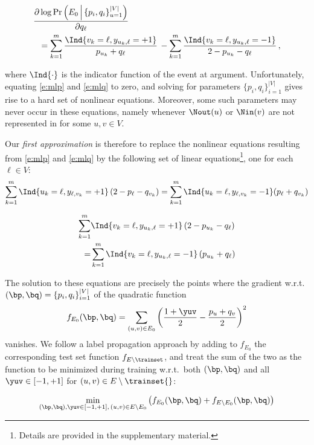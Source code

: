 \begin{align}
&\frac{\partial \log \Pr\left(E_0 \,\Big|\, \{p_i, q_i\}_{u=1}^{|V|}\right)}{\partial q_{\ell}}\label{e:mlq}\\
&\ \ =
\sum_{k=1}^m
\frac{\Ind{v_k = \ell,y_{u_k,\ell}=+1}}{p_{u_k}+q_{\ell}}\,
- \sum_{k=1}^m
\frac{\Ind{v_k = \ell,y_{u_k,\ell}=-1}}{2-p_{u_k}-q_{\ell}}\,,\notag
\end{align}

where $\Ind{\cdot}$ is the indicator function of the event at argument.
Unfortunately, equating \eqref{e:mlp} and \eqref{e:mlq} to zero, and solving for parameters
$\{p_i, q_i\}_{i=1}^{|V|}$ gives rise to a hard set of nonlinear equations.
Moreover, some such parameters may never occur in these equations, namely whenever $\Nout(u)$ or
$\Nin(v)$ are not represented in \trainset{} for some $u,v\in V$.

Our \emph{first approximation} is therefore to replace the nonlinear equations resulting
from \eqref{e:mlp} and \eqref{e:mlq} by the following set of linear equations\footnote{Details
are provided in the supplementary material.}, one for each $\ell \in V$:
\begin{equation*}
  \sum_{k=1}^m \Ind{u_k = \ell,y_{\ell,v_k}=+1} \left(2-p_{\ell}-q_{v_k}\right)
  = \sum_{k=1}^m \Ind{u_k = \ell,y_{\ell,v_k}=-1}
  (p_{\ell}+q_{v_k})
\end{equation*}

\begin{align*}
  \sum_{k=1}^m &\Ind{v_k = \ell,y_{u_k,\ell}=+1} \left(2-p_{u_k}-q_{\ell}\right)\\
  =
  &\sum_{k=1}^m  \Ind{v_k = \ell,y_{u_k,\ell}=-1}
  \left(p_{u_k}+q_{\ell}\right)
\end{align*}

The solution to these equations are precisely the points where the gradient w.r.t.\ $(\bp,\bq)
=\{p_i, q_i\}_{i=1}^{|V|}$ of the quadratic function
\[
f_{E_0}(\bp,\bq) = \sum_{(u,v) \in E_0} \left(\frac{1+\yuv}{2} - \frac{p_u+q_v}{2} \right)^2
\]
vanishes.
We follow a label propagation approach by adding to $f_{E_0}$ the corresponding test set function
$f_{E\setminus \trainset}$, and treat the sum of the two as the function to be minimized during
training w.r.t.\ both $(\bp,\bq)$ and all $\yuv \in [-1,+1]$ for $(u,v)\in E\setminus \trainset{}$:

\begin{equation}\label{e:quadratic}
  \min_{(\bp,\bq), \yuv \in [-1,+1],\,(u,v)\in E\setminus E_0}
  \left(f_{E_0}(\bp,\bq) + f_{E\setminus E_0}(\bp,\bq)\right)
\end{equation}

